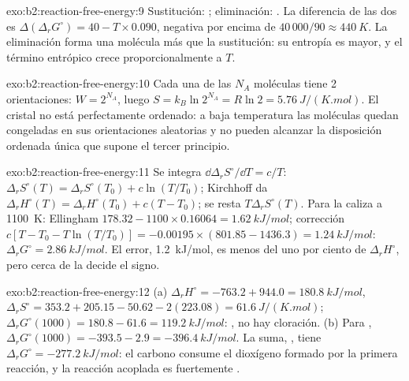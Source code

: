 \begin{solution}{exo:b2:reaction-free-energy:9}
Sustitución: ; eliminación:
. La diferencia de las dos
 es $\Delta(\Delta_r G^\circ) = 40 - T \times
0.090$, negativa por encima de $40\,000/90 \approx \qty{440}{K}$. La eliminación forma
una molécula más que la sustitución: su entropía es mayor, y el término
entrópico crece proporcionalmente a $T$.
\end{solution}

\begin{solution}{exo:b2:reaction-free-energy:10}
Cada una de las $N_A$ moléculas tiene 2 orientaciones: $W = 2^{N_A}$, luego $S =
k_B\ln 2^{N_A} = R\ln 2 = \qty{5.76}{J/(K.mol)}$. El cristal no está
perfectamente ordenado: a baja temperatura las moléculas quedan congeladas en sus
orientaciones aleatorias y no pueden alcanzar la disposición ordenada única que supone el tercer
principio.
\end{solution}

\begin{solution}{exo:b2:reaction-free-energy:11}
Se integra $\dd\Delta_r S^\circ/\dd T = c/T$: $\Delta_r S^\circ(T) = \Delta_r
S^\circ(T_0) + c\ln(T/T_0)$; Kirchhoff da $\Delta_r H^\circ(T) = \Delta_r
H^\circ(T_0) + c(T - T_0)$; se resta $T\Delta_r S^\circ(T)$. Para la caliza a
\qty{1100}{K}: Ellingham $178.32 - 1100 \times 0.16064 = \qty{1.62}{kJ/mol}$;
corrección $c[T - T_0 - T\ln(T/T_0)] = -0.00195 \times (801.85 - 1436.3) =
\qty{+1.24}{kJ/mol}$: $\Delta_r G^\circ = \qty{2.86}{kJ/mol}$. El error,
\qty{1.2}{kJ/mol}, es menos del uno por ciento de $\Delta_r H^\circ$, pero cerca de
la  decide el signo.
\end{solution}

\begin{solution}{exo:b2:reaction-free-energy:12}
(a) $\Delta_r H^\circ = -763.2 + 944.0 = \qty{+180.8}{kJ/mol}$, $\Delta_r
S^\circ = 353.2 + 205.15 - 50.62 - 2(223.08) = \qty{+61.6}{J/(K.mol)}$;
$\Delta_r G^\circ(1000) = 180.8 - 61.6 = \qty{+119.2}{kJ/mol}$: ,
no hay cloración. (b) Para , $\Delta_r G^\circ(1000) =
-393.5 - 2.9 = \qty{-396.4}{kJ/mol}$. La suma, , tiene $\Delta_r G^\circ = \qty{-277.2}{kJ/mol}$: el carbono
consume el dioxígeno formado por la primera reacción, y la reacción acoplada es
fuertemente .
\end{solution}

